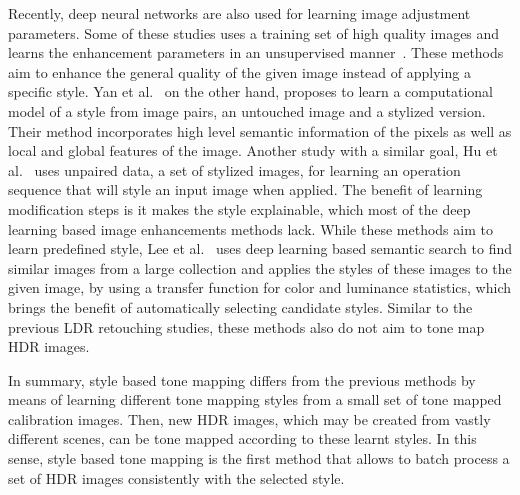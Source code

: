 Recently, deep neural networks are also used for learning image adjustment parameters. Some of these studies uses a training set of high quality images and learns the enhancement parameters in an unsupervised manner~\cite{park2018distort, chen2018deep,ignatov2018wespe}. These methods aim to enhance the general quality of the given image instead of applying a specific style. Yan et al.~\cite{yan2016automatic} on the other hand, proposes to learn a computational model of a style from image pairs, an untouched image and a stylized version. Their method incorporates high level semantic information of the pixels as well as local and global features of the image. Another study with a similar goal, Hu et al.~\cite{hu2018exposure} uses unpaired data, a set of stylized images, for learning an operation sequence that will style an input image when applied. The benefit of learning modification steps is it makes the style explainable, which most of the deep learning based image enhancements methods lack. While these methods aim to learn predefined style, Lee et al.~\cite{lee2016automatic} uses deep learning based semantic search to find similar images from a large collection and applies the styles of these images to the given image, by using a transfer function for color and luminance statistics, which brings the benefit of automatically selecting candidate styles. Similar to the previous LDR retouching studies, these methods also do not aim to tone map HDR images.

In summary, style based tone mapping differs from the previous methods by means of learning different tone mapping styles from a small set of tone mapped calibration images. Then, new HDR images, which may be created from vastly different scenes, can be tone mapped according to these learnt styles. In this sense, style based tone mapping is the first method that allows to batch process a set of HDR images consistently with the selected style.


